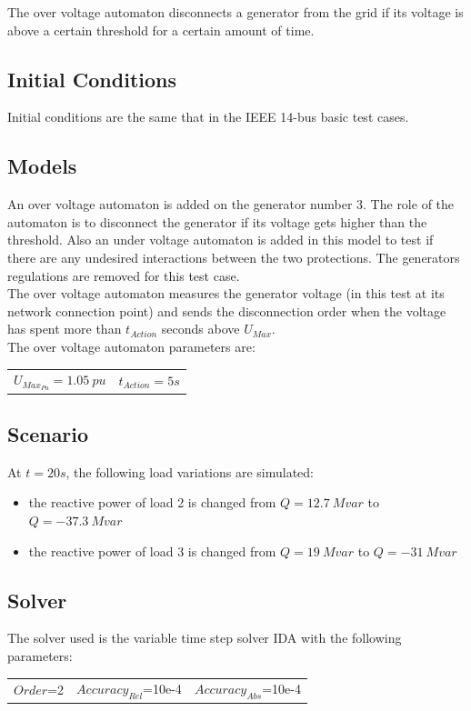\documentclass[a4paper, 12pt]{report}
\begin{document}
The over voltage automaton disconnects a generator from the grid if its voltage is above a certain threshold for a certain amount of time.

\subsection{Initial Conditions}

Initial conditions are the same that in the IEEE 14-bus basic test cases.

\subsection{Models}

An over voltage automaton is added on the generator number 3. The role of the automaton is to disconnect the generator if its voltage gets higher than the threshold.
Also an under voltage automaton is added in this model to test if there are any undesired interactions between the two protections. The generators regulations are removed for this test case.\\

The over voltage automaton measures the generator voltage (in this test at its network connection point) and sends the disconnection order when the voltage has spent more than $t_{Action}$ seconds above $U_{Max}$.\\

The over voltage automaton parameters are:
\begin{center}
\begin{tabular}{l|l}
   $U_{Max_{Pu}}= 1.05\ pu$ & $t_{Action}=5s$  \\
\end{tabular}
\end{center}

\subsection{Scenario}
At $t=20s$, the following load variations are simulated:
\begin{itemize}
\item{the reactive power of load 2 is changed from $Q=12.7\ Mvar$ to $Q=-37.3\ Mvar$}
\item{the reactive power of load 3 is changed from $Q=19\ Mvar$ to $Q=-31\ Mvar$}
\end{itemize}

\subsection{Solver}
The solver used is the variable time step solver IDA with the following parameters:
\begin{center}
\begin{tabular}{l|l|l}
   $Order$=2 & $Accuracy_{Rel}$=10e-4 & $Accuracy_{Abs}$=10e-4 \\
\end{tabular}
\end{center}
\end{document}
